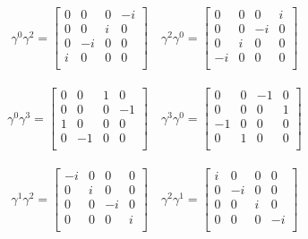 \documentclass{article}
\begin{document}
\begin{align*}
\gamma^0 \gamma^2 = \begin{bmatrix}
 0  &  0  &  0  &  -i  \\
 0  &  0  &  i  &  0  \\
 0  &  -i  &  0  &  0  \\
 i  &  0  &  0  &  0  \\
\end{bmatrix} \quad
\gamma^2 \gamma^0 = \begin{bmatrix}
 0  &  0  &  0  &  i  \\
 0  &  0  &  -i  &  0  \\
 0  &  i  &  0  &  0  \\
 -i  &  0  &  0  &  0  \\
\end{bmatrix}
\end{align*}

\begin{align*}
\gamma^0 \gamma^3 = \begin{bmatrix}
 0  &  0  &  1  &  0  \\
 0  &  0  &  0  &  -1  \\
 1  &  0  &  0  &  0  \\
 0  &  -1  &  0  &  0  \\
\end{bmatrix} \quad
\gamma^3 \gamma^0 = \begin{bmatrix}
 0  &  0  &  -1  &  0  \\
 0  &  0  &  0  &  1  \\
 -1  &  0  &  0  &  0  \\
 0  &  1  &  0  &  0  \\
\end{bmatrix}
\end{align*}

\begin{align*}
\gamma^1 \gamma^2 = \begin{bmatrix}
 -i  &  0  &  0  &  0  \\
 0  &  i  &  0  &  0  \\
 0  &  0  &  -i  &  0  \\
 0  &  0  &  0  &  i  \\
\end{bmatrix} \quad
\gamma^2 \gamma^1 = \begin{bmatrix}
 i  &  0  &  0  &  0  \\
 0  &  -i  &  0  &  0  \\
 0  &  0  &  i  &  0  \\
 0  &  0  &  0  &  -i  \\
\end{bmatrix}
\end{align*}
\end{document}
